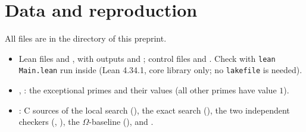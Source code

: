 \documentclass[11pt]{article}
\numberwithin{equation}{section}
\theoremstyle{definition}
\theoremstyle{remark}
\begin{document}
\section{Data and reproduction}
All files are in the directory of this preprint.
\begin{itemize}
\item Lean files  and , with outputs
 and ; control files
 and . Check with
\texttt{lean Main.lean} run inside  (Lean 4.34.1, core library only; no \texttt{lakefile}
is needed).
\item {}, : the exceptional primes and their
values (all other primes have value $1$).
\item {}: C sources of the local search (), the exact search (),
the two independent checkers (, ), the $\Omega$-baseline (),
and .
\end{itemize}

{\small


}
\end{document}
